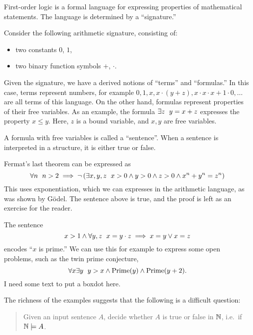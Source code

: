 
First-order logic is a formal language for expressing properties of mathematical
statements.
The language is determined by a \enquote{signature.}

\begin{example}
  Consider the following arithmetic signature, consisting of:
  \begin{itemize}
  \item two constants $0$, $1$,
  \item two binary function symbols $+$, $\cdot$.
  \end{itemize}
  Given the signature, we have a derived notions of \enquote{terms} and
  \enquote{formulas.}
  In this case, terms represent numbers, for example $0, 1, x, x \cdot (y+z),
  x \cdot x \cdot x + 1 \cdot 0, \ldots$ are all terms of this language.
  On the other hand, formulas represent properties of their free variables.
  As an example, the formula $\exists z \;\  y = x + z$ expresses the property
  $x \le y$.
  Here, $z$ is a bound variable, and $x, y$ are free variables.
  \boxdot{}
\end{example}

A formula with free variables is called a \enquote{sentence}.
When a sentence is interpreted in a structure, it is either true or false.

\begin{example}
  Fermat's last theorem can be expressed as
  \[
	\forall n \;\  n > 2 \implies \lnot \left(
	  \exists x, y, z \;\  x > 0 \land y > 0 \land z > 0
	  \land x^n + y^n = z^n
	\right)
  \]
  This uses exponentiation, which we can expresses in the arithmetic language,
  as was shown by Gödel.
  The sentence above is true, and the proof is left as an exercise for the
  reader.
  \boxdot{}
\end{example}

\begin{example}
  The sentence
  \[
	x > 1 \land \forall y, z \;\  x = y \cdot z \implies x = y \lor x = z
  \]
  encodes \enquote{$x$ is prime.}
  We can use this for example to express some open problems, such as the twin
  prime conjecture,
  \[
	\forall x \exists y \;\  y > x \land \operatorname{Prime}(y) \land
	\operatorname{Prime}(y+2).
  \]
  I need some text to put a boxdot here.
  \boxdot{}
\end{example}

The richness of the examples suggests that the following is a difficult
question:
\begin{quote}
  Given an input sentence $A$, decide whether $A$ is true or false in
  $\mathbb{N}$, i.e.~if $\mathbb{N} \models A$.
\end{quote}

